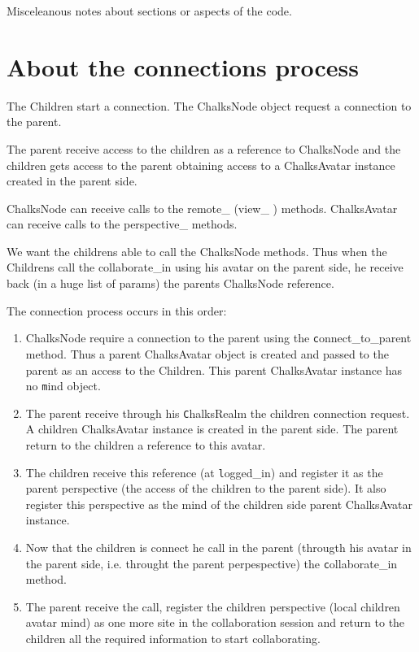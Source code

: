 \documentclass{report}
\begin{document}
Misceleanous notes about sections or aspects of the code.

\section{About the connections process}

The Children start a connection. The ChalksNode object request a connection to the parent. 

The parent receive access to the children as a reference to ChalksNode and the children gets access to the parent obtaining access to a ChalksAvatar instance created in the parent side.

ChalksNode can receive calls to the remote\_ (view\_ ) methods.
ChalksAvatar can receive calls to the perspective\_ methods.

We want the childrens able to call the ChalksNode methods. Thus when the Childrens call the collaborate\_in using his avatar on the parent side, he receive back (in a huge list of params) the parents ChalksNode reference.

The connection process occurs in this order:
\begin{enumerate}
\item ChalksNode require a connection to the parent using the {\texttt connect\_to\_parent} method. Thus a parent ChalksAvatar object is created and passed to the parent as an access to the Children. This parent ChalksAvatar instance has no {\texttt mind} object.

\item The parent receive through his {\texttt ChalksRealm} the children connection request. A children ChalksAvatar instance is created in the parent side. The parent return to the children a reference to this avatar.

\item The children receive this reference (at {\texttt logged\_in}) and register it as the parent perspective (the access of the children to the parent side). It also register this perspective as the mind of the children side parent ChalksAvatar instance.

\item Now that the children is connect he call in the parent (througth his avatar in the parent side, i.e. throught the parent perpespective) the {\texttt collaborate\_in} method.

\item The parent receive the call, register the children perspective (local children avatar mind) as one more site in the collaboration session and return to the children all the required information to start collaborating.

\end{enumerate}
\end{document}
